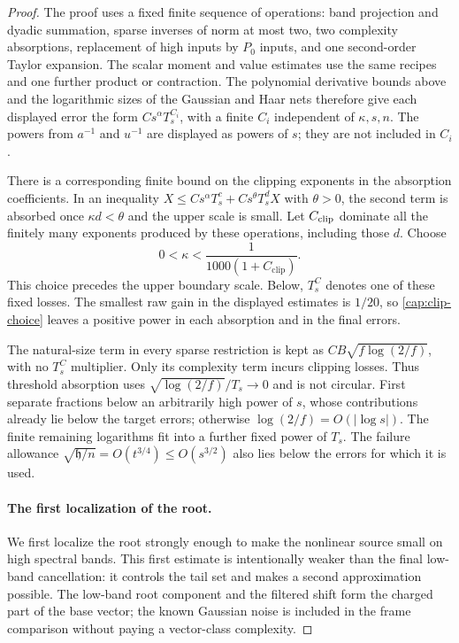 \begin{proof}
The proof uses a fixed finite sequence of operations: band projection and
dyadic summation, sparse inverses of norm at most two, two complexity
absorptions, replacement of high inputs by \(P_0\) inputs, and one
second-order Taylor expansion. The scalar moment and value estimates use the
same recipes and one further product or contraction. The polynomial
derivative bounds above and the logarithmic sizes of the Gaussian and Haar
nets therefore give each displayed error the form
\(Cs^\alpha T_s^{C_i}\), with a finite \(C_i\) independent of
\(\kappa,s,n\). The powers from \(a^{-1}\) and \(u^{-1}\) are displayed
as powers of \(s\); they are not included in \(C_i\).

There is a corresponding finite bound on the clipping exponents in the
absorption coefficients. In an inequality
\(X\le Cs^\alpha T_s^c+Cs^\theta T_s^dX\) with \(\theta>0\),
the second term is absorbed once \(\kappa d<\theta\) and the upper scale is
small. Let \(C_{\rm clip}\) dominate all the finitely many exponents
produced by these operations, including those \(d\). Choose
\begin{equation}\label{cap:clip-choice}
 0<\kappa<\frac1{1000(1+C_{\mathrm{clip}})}.
\end{equation}
This choice precedes the upper boundary scale. Below, \(T_s^C\) denotes one
of these fixed losses. The smallest raw gain in the displayed estimates is
\(1/20\), so \eqref{cap:clip-choice} leaves a positive power in each
absorption and in the final errors.

The natural-size term in every sparse restriction is kept as
$CB\sqrt{f\log(2/f)}$, with no $T_s^C$ multiplier. Only its complexity term
incurs clipping losses. Thus threshold absorption uses
$\sqrt{\log(2/f)}/T_s\to0$ and is not circular. First separate fractions below
an arbitrarily high power of $s$, whose contributions already lie below the
target errors; otherwise $\log(2/f)=O(|\log s|)$. The finite remaining
logarithms fit into a further fixed power of $T_s$. The failure allowance
$\sqrt{\mathfrak h/n}=O(t^{3/4})\le O(s^{3/2})$ also lies below the errors for
which it is used.

\paragraph{The first localization of the root.}
We first localize the root strongly enough to make the nonlinear source
small on high spectral bands. This first estimate is intentionally weaker
than the final low-band cancellation: it controls the tail set and makes a
second approximation possible. The low-band root component and the filtered
shift form the charged part of the base vector; the known Gaussian noise is
included in the frame comparison without paying a vector-class complexity.


\end{proof}
